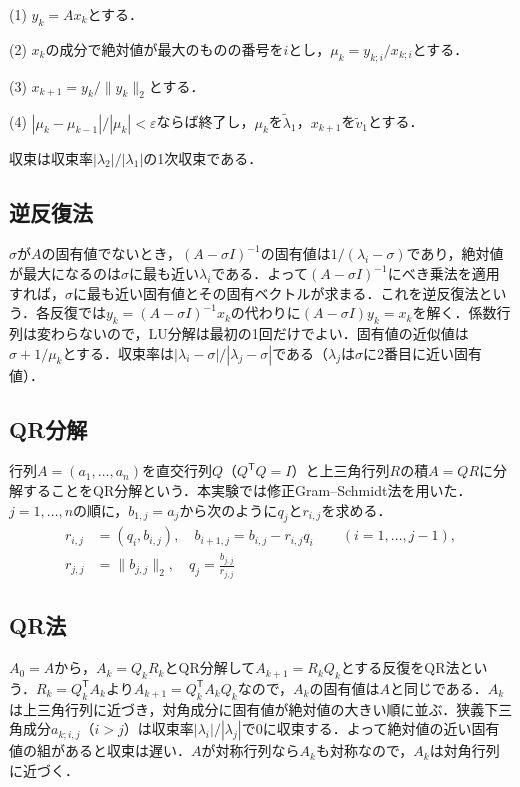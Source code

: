 \documentclass{jarticle}
\begin{document}
(1) $y_k=Ax_k$とする．

(2) $x_k$の成分で絶対値が最大のものの番号を$i$とし，$\mu_k=y_{k;i}/x_{k;i}$とする．

(3) $x_{k+1}=y_k/\|y_k\|_2$とする．

(4) $|\mu_k-\mu_{k-1}|/|\mu_k|<\varepsilon$ならば終了し，$\mu_k$を$\tilde{\lambda}_1$，$x_{k+1}$を$\tilde{v}_1$とする．

収束は収束率$|\lambda_2|/|\lambda_1|$の1次収束である．

\subsection{逆反復法}
$\sigma$が$A$の固有値でないとき，$(A-\sigma I)^{-1}$の固有値は$1/(\lambda_i-\sigma)$であり，絶対値が最大になるのは$\sigma$に最も近い$\lambda_i$である．よって$(A-\sigma I)^{-1}$にべき乗法を適用すれば，$\sigma$に最も近い固有値とその固有ベクトルが求まる．これを逆反復法という．各反復では$y_k=(A-\sigma I)^{-1}x_k$の代わりに$(A-\sigma I)y_k=x_k$を解く．係数行列は変わらないので，LU分解は最初の1回だけでよい．固有値の近似値は$\sigma+1/\mu_k$とする．収束率は$|\lambda_i-\sigma|/|\lambda_j-\sigma|$である（$\lambda_j$は$\sigma$に2番目に近い固有値）．

\subsection{QR分解}
行列$A=(a_1,\ldots,a_n)$を直交行列$Q$（$Q^{\mathsf T}Q=I$）と上三角行列$R$の積$A=QR$に分解することをQR分解という．本実験では修正Gram--Schmidt法を用いた．$j=1,\ldots,n$の順に，$b_{1,j}=a_j$から次のように$q_j$と$r_{i,j}$を求める．
\begin{align*}
    r_{i,j}&=(q_i,b_{i,j}),\quad b_{i+1,j}=b_{i,j}-r_{i,j}q_i \qquad (i=1,\ldots,j-1),\\
    r_{j,j}&=\|b_{j,j}\|_2,\quad q_j=\frac{b_{j,j}}{r_{j,j}}
\end{align*}

\subsection{QR法}
$A_0=A$から，$A_k=Q_kR_k$とQR分解して$A_{k+1}=R_kQ_k$とする反復をQR法という．$R_k=Q_k^{\mathsf T}A_k$より$A_{k+1}=Q_k^{\mathsf T}A_kQ_k$なので，$A_k$の固有値は$A$と同じである．$A_k$は上三角行列に近づき，対角成分に固有値が絶対値の大きい順に並ぶ．狭義下三角成分$a_{k;i,j}$（$i>j$）は収束率$|\lambda_i|/|\lambda_j|$で0に収束する．よって絶対値の近い固有値の組があると収束は遅い．$A$が対称行列なら$A_k$も対称なので，$A_k$は対角行列に近づく．
\end{document}
